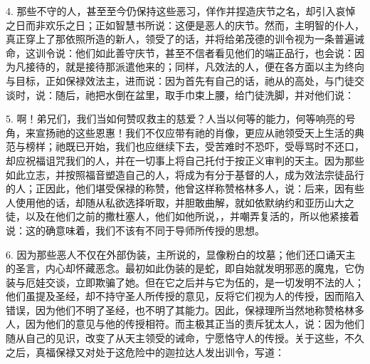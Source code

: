 4. 那些不守的人，甚至至今仍保持这些恶习，佯作并捏造庆节之名，却引入哀悼之日而非欢乐之日；正如智慧书所说：这便是恶人的庆节。然而，主明智的仆人，真正穿上了那依照所造的新人，领受了的话，并将给弟茂德的训令视为一条普遍诫命，这训令说：他们如此善守庆节，甚至不信者看见他们的端正品行，也会说：因为凡接待的，就是接待那派遣他来的；同样，凡效法的人，便在各方面以主为终向与目标，正如保禄效法主，进而说：因为首先有自己的话，祂从的高处，与门徒交谈时，说：随后，祂把水倒在盆里，取手巾束上腰，给门徒洗脚，并对他们说：\par

5. 啊！弟兄们，我们当如何赞叹救主的慈爱？人当以何等的能力，何等响亮的号角，来宣扬祂的这些恩惠！我们不仅应带有祂的肖像，更应从祂领受天上生活的典范与榜样；祂既已开始，我们也应继续下去，受苦难时不恐吓，受辱骂时不还口，却应祝福诅咒我们的人，并在一切事上将自己托付于按正义审判的天主。因为那些如此立志，并按照福音塑造自己的人，将成为有分于基督的人，成为效法宗徒品行的人；正因此，他们堪受保禄的称赞，他曾这样称赞格林多人，说：后来，因有些人使用他的话，却随从私欲选择听取，并胆敢曲解，就如依默纳约和亚历山大之徒，以及在他们之前的撒杜塞人，他们如他所说，，并嘲弄复活的，所以他紧接着说：这的确意味着，我们不该有不同于导师所传授的思想。\par

6. 因为那些恶人不仅在外部伪装，主所说的，显像粉白的坟墓；他们还口诵天主的圣言，内心却怀藏恶念。最初如此伪装的是蛇，即自始就发明邪恶的魔鬼，它伪装与厄娃交谈，立即欺骗了她。但在它之后并与它为伍的，是一切发明不法的人；他们虽提及圣经，却不持守圣人所传授的意见，反将它们视为人的传授，因而陷入错误，因为他们不明了圣经，也不明了其能力。因此，保禄理所当然地称赞格林多人，因为他们的意见与他的传授相符。而主极其正当的责斥犹太人，说：因为他们随从自己的见识，改变了从天主领受的诫命，宁愿恪守人的传授。关于这些，不久之后，真福保禄又对处于这危险中的迦拉达人发出训令，写道：\par

